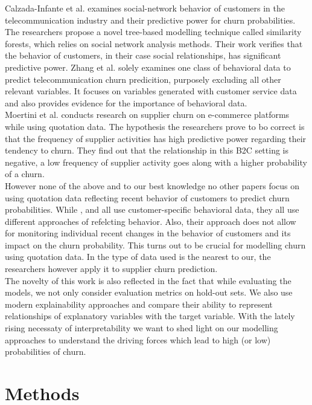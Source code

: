 \documentclass[12pt,titlepage]{article}
\begin{document}
Calzada-Infante et al. \cite{calzada} examines social-network behavior of customers in the telecommunication industry and their predictive power for churn probabilities. The researchers propose a novel tree-based modelling technique called similarity forests, which relies on social network analysis methods. Their work verifies that the behavior of customers, in their case social relationships, has significant predictive power. Zhang et al. \cite{zhang} solely examines one class of behavioral data to predict telecommunication churn predicition, purposely excluding all other relevant variables. It focuses on variables generated with customer service data and also provides evidence for the importance of behavioral data. \\
Moertini et al. \cite{moertini} conducts research on supplier churn on e-commerce platforms while using quotation data. The hypothesis the researchers prove to bo correct is that the frequency of supplier activities has high predictive power regarding their tendency to churn. They find out that the relationship in this B2C setting is negative, a low frequency of supplier activity goes along with a higher probability of a churn. \\
However none of the above and to our best knowledge no other papers focus on using quotation data reflecting recent behavior of customers to predict churn probabilities. While \cite{khodabandehlou}, \cite{calzada} and \cite{zhang} all use customer-specific behavioral data, they all use different approaches of refelcting behavior. Also, their approach does not allow for monitoring individual recent changes in the behavior of customers and its impact on the churn probability. This turns out to be crucial for modelling churn using quotation data. In \cite{moertini} the type of data used is the nearest to our, the researchers however apply it to supplier churn prediction. \\
The novelty of this work is also reflected in the fact that while evaluating the models, we not only consider evaluation metrics on hold-out sets. We also use modern explainability approaches and compare their ability to represent relationships of explanatory variables with the target variable. With the lately rising necessaty of interpretability we want to shed light on our modelling approaches to understand the driving forces which lead to high (or low) probabilities of churn. \\


\section{Methods} \par
\end{document}

